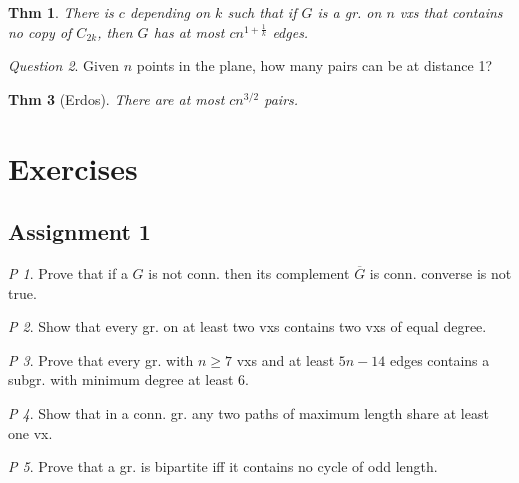 \documentclass[11pt, fleqn, a4paper, landscape]{article}
\theoremstyle{plain} %
\newtheorem{thm}{Thm}
\theoremstyle{remark} %
\newtheorem{que}[thm]{Question}
\newtheorem{problem}{P}
\theoremstyle{definition} %
\begin{document}
\begin{multicols}{5}
\begin{thm}
There is $c$ depending on $k$ such that if $G$ is a gr. on $n$ vxs that contains no copy of $C_{2k}$, then $G$ has at most $cn^{1+\frac{1}{k}}$ edges.
\end{thm}

\begin{que}
Given $n$ points in the plane, how many pairs can be at distance 1?
\end{que}

\begin{thm}[Erdos]
There are at most $cn^{3/2}$ pairs.
\end{thm}

\section{Exercises}
\subsection{Assignment 1}


\addtocounter{problem}{1}

\addtocounter{problem}{1}

\begin{problem}
Prove that if a $G$ is not conn. then its complement $\overline{G}$ is conn. converse is not true.
\end{problem}

\begin{problem}
Show that every gr. on at least two vxs contains two vxs of equal
degree.
\end{problem}

\begin{problem}
Prove that every gr. with $n \ge 7$ vxs and at least $5n- 14$ edges contains a subgr. with minimum degree at least 6.
\end{problem}

\begin{problem}
Show that in a conn. gr. any two paths of maximum length share at least
one vx.
\end{problem}

\begin{problem}
Prove that a gr. is bipartite iff it contains no cycle of odd length.
\end{problem}


\end{multicols}
\end{document}
